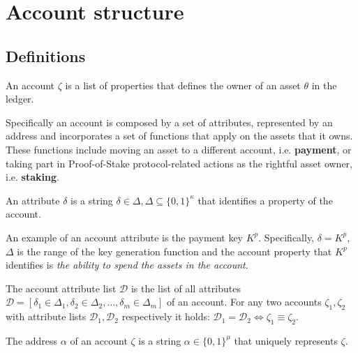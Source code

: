 \section{Account structure}\label{sec:account}

\subsection{Definitions}

\begin{defn}[Account]\label{def:account}
An account $\zeta$ is a list of properties that defines the owner of an asset $\theta$ in the ledger.
\end{defn}

Specifically an account is composed by a set of attributes, represented by an address and incorporates a set of functions that apply on the assets that it owns. These functions include moving an asset to a different account, i.e. \textbf{payment}, or taking part in Proof-of-Stake protocol-related actions as the rightful asset owner, i.e. \textbf{staking}.

\begin{defn}\label{def:attribute}
An attribute $\delta$ is a string $\delta \in \Delta, \Delta \subseteq \{0, 1\}^\kappa$ that identifies a property of the account.
\end{defn}

An example of an account attribute is the payment key $K^p$. Specifically, $\delta = K^p$, $\Delta$ is the range of the key generation function and the account property that $K^p$ identifies is \textit{the ability to spend the assets in the account}.

\begin{defn}\label{def:attributelist}
The account attribute list $\mathcal{D}$ is the list of all attributes $\mathcal{D} = [{\delta}_1 \in {\Delta}_1, {\delta}_2 \in {\Delta}_2, \ldots, {\delta}_m \in {\Delta}_m]$ of an account. For any two accounts ${\zeta}_1, {\zeta}_2$ with attribute lists ${\mathcal{D}}_1, {\mathcal{D}}_2$ respectively it holds: ${\mathcal{D}}_1 = {\mathcal{D}}_2 \iff {\zeta}_1 \equiv {\zeta}_2$.
\end{defn}

\begin{defn}\label{def:address}
The address $\alpha$ of an account $\zeta$ is a string $\alpha \in \{0, 1\}^\mu$ that uniquely represents $\zeta$.
\end{defn}

